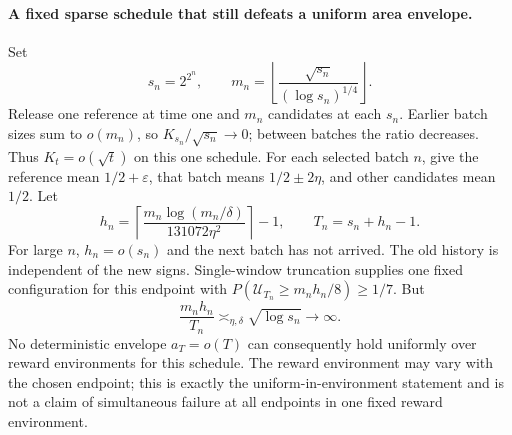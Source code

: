 \paragraph{A fixed sparse schedule that still defeats a uniform area envelope.}
Set
\[
 s_n=2^{2^n},\qquad
 m_n=\left\lfloor\frac{\sqrt{s_n}}{(\log s_n)^{1/4}}\right\rfloor.
\]
Release one reference at time one and $m_n$ candidates at each $s_n$.
Earlier batch sizes sum to $o(m_n)$, so $K_{s_n}/\sqrt{s_n}\to0$; between
batches the ratio decreases. Thus $K_t=o(\sqrt t)$ on this one schedule.
For each selected batch $n$, give the reference mean $1/2+\varepsilon$,
that batch means $1/2\pm2\eta$, and other candidates mean $1/2$. Let
\[
 h_n=\left\lceil\frac{m_n\log(m_n/\delta)}{131072\eta^2}\right\rceil-1,
 \qquad T_n=s_n+h_n-1.
\]
For large $n$, $h_n=o(s_n)$ and the next batch has not arrived. The old
history is independent of the new signs. Single-window truncation supplies
one fixed configuration for this endpoint with
$P(\mathcal U_{T_n}\ge m_nh_n/8)\ge1/7$. But
\[
 \frac{m_nh_n}{T_n}\asymp_{\eta,\delta}\sqrt{\log s_n}\longrightarrow\infty.
\]
No deterministic envelope $a_T=o(T)$ can consequently hold uniformly over
reward environments for this schedule. The reward environment may vary
with the chosen endpoint; this is exactly the uniform-in-environment
statement and is not a claim of simultaneous failure at all endpoints in
one fixed reward environment.
